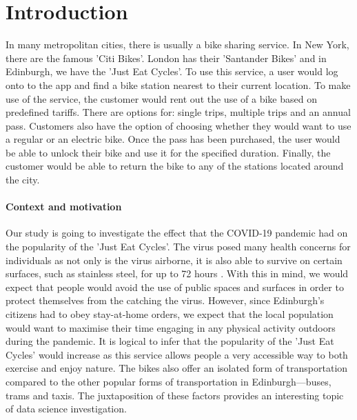 \documentclass[11pt,a4paper]{article}
\begin{document}
\section{Introduction}

In many metropolitan cities, there is usually a bike sharing service. In New York, there are the famous 'Citi Bikes'. London has their 'Santander Bikes' and in Edinburgh, we have the 'Just Eat Cycles'. To use this service, a user would log onto to the app and find a bike station nearest to their current location. To make use of the service, the customer would rent out the use of a bike based on predefined tariffs. There are options for: single trips, multiple trips and an annual pass. Customers also have the option of choosing whether they would want to use a regular or an electric bike. Once the pass has been purchased, the user would be able to unlock their bike and use it for the specified duration. Finally, the customer would be able to return the bike to any of the stations located around the city.

\paragraph{Context and motivation}

Our study is going to investigate the effect that the COVID-19 pandemic had on the popularity of the 'Just Eat Cycles'. The virus posed many health concerns for individuals as not only is the virus airborne, it is also able to survive on certain surfaces, such as stainless steel, for up to 72 hours \cite{Hammett1}. With this in mind, we would expect that people would avoid the use of public spaces and surfaces in order to protect themselves from the catching the virus. However, since Edinburgh's citizens had to obey stay-at-home orders, we expect that the local population would want to maximise their time engaging in any physical activity outdoors during the pandemic. It is logical to infer that the popularity of the 'Just Eat Cycles' would increase as this service allows people a very accessible way to both exercise and enjoy nature. The bikes also offer an isolated form of transportation compared to the other popular forms of transportation in Edinburgh—buses, trams and taxis. The juxtaposition of these factors provides an interesting topic of data science investigation.  
\end{document}
